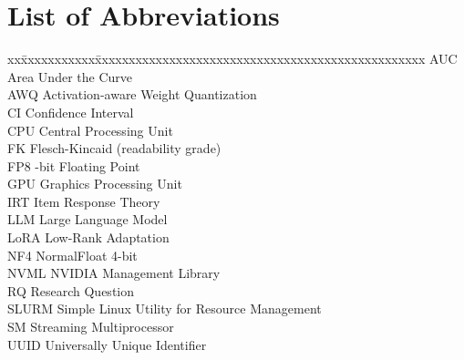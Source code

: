 \chapter*{List of Abbreviations}
\thispagestyle{empty}
\begin{tabbing}
xx\=xxxxxxxxxxx\=xxxxxxxxxxxxxxxxxxxxxxxxxxxxxxxxxxxxxxxxxxxxxxxxx\kill
\>AUC \> Area Under the Curve\\
\>AWQ \> Activation-aware Weight Quantization\\
\>CI \> Confidence Interval\\
\>CPU \> Central Processing Unit\\
\>FK \> Flesch-Kincaid (readability grade)\\
\>FP8 -bit Floating Point\\
\>GPU \> Graphics Processing Unit\\
\>IRT \> Item Response Theory\\
\>LLM \> Large Language Model\\
\>LoRA \> Low-Rank Adaptation\\
\>NF4 \> NormalFloat 4-bit\\
\>NVML \> NVIDIA Management Library\\
\>RQ \> Research Question\\
\>SLURM \> Simple Linux Utility for Resource Management\\
\>SM \> Streaming Multiprocessor\\
\>UUID \> Universally Unique Identifier\\
\end{tabbing}
